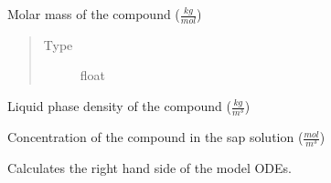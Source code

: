 \documentclass[letterpaper,10pt,english]{sphinxmanual}
\begin{document}
\begin{fulllineitems}
\begin{fulllineitems}
\begin{quote}
\begin{description}
\end{description}\end{quote}

\end{fulllineitems}


\begin{fulllineitems}
\label{\detokenize{index:src.solute.Solute.molar_mass}}
Molar mass of the compound (\(\frac{kg}{mol}\))
\begin{quote}\begin{description}
\item[{Type}] \leavevmode
float

\end{description}\end{quote}

\end{fulllineitems}


\begin{fulllineitems}
\label{\detokenize{index:src.solute.Solute.density}}
Liquid phase density of the compound (\(\frac{kg}{m^3}\))

\end{fulllineitems}


\begin{fulllineitems}
\label{\detokenize{index:src.solute.Solute.concentration}}
Concentration of the compound in the sap solution (\(\frac{mol}{m^3}\))

\end{fulllineitems}


\end{fulllineitems}


\begin{fulllineitems}
\label{\detokenize{index:src.odefun.odefun}}
Calculates the right hand side of the model ODEs.

\end{fulllineitems}
\end{document}
